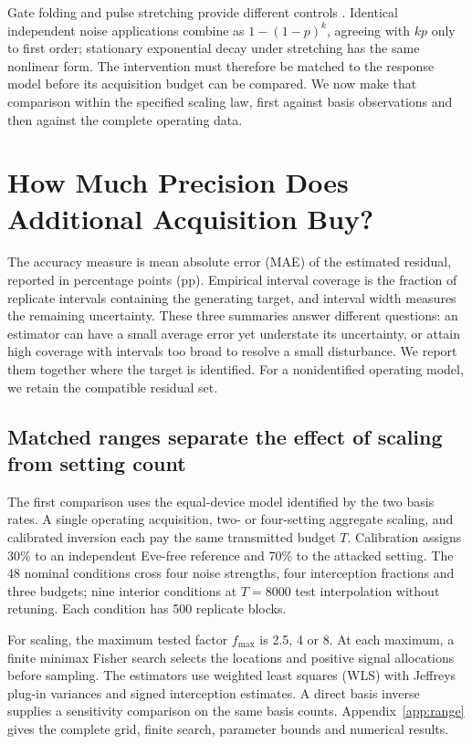 \documentclass[manuscript,screen,review,anonymous]{acmart}
\begin{document}
Gate folding and pulse stretching provide different controls
\cite{giurgicatiron2020,temme2017}. Identical independent noise applications
combine as $1-(1-p)^k$, agreeing with $kp$ only to first order; stationary
exponential decay under stretching has the same nonlinear form.
The intervention must therefore be matched to the response model before
its acquisition budget can be compared. We now make that comparison within
the specified scaling law, first against basis observations and then against
the complete operating data.

\section{How Much Precision Does Additional Acquisition Buy?}
\label{sec:precision}
The accuracy measure is mean absolute error (MAE) of the estimated residual,
reported in percentage points (pp). Empirical interval coverage is the fraction
of replicate intervals containing the generating target, and interval width
measures the remaining uncertainty. These three summaries answer different
questions: an estimator can have a small average error yet understate its
uncertainty, or attain high coverage with intervals too broad to resolve a
small disturbance. We report them together where the target is identified.
For a nonidentified operating model, we retain the compatible residual set.

\subsection{Matched ranges separate the effect of scaling from setting count}
The first comparison uses the equal-device model identified by the two basis
rates. A single operating acquisition, two- or four-setting aggregate scaling,
and calibrated inversion each pay the same transmitted budget $T$.
Calibration assigns 30\% to an independent Eve-free reference and 70\% to the
attacked setting. The 48 nominal conditions cross four noise strengths, four
interception fractions and three budgets; nine interior conditions at $T=8000$
test interpolation without retuning. Each condition has 500 replicate blocks.

For scaling, the maximum tested factor $f_{\max}$ is 2.5, 4 or 8.
At each maximum, a finite minimax Fisher search selects the locations and
positive signal allocations before sampling. The estimators use weighted
least squares (WLS) with Jeffreys plug-in variances and signed interception
estimates. A direct basis inverse supplies a sensitivity comparison on the
same basis counts. Appendix~\ref{app:range} gives the complete grid, finite
search, parameter bounds and numerical results.
\end{document}
